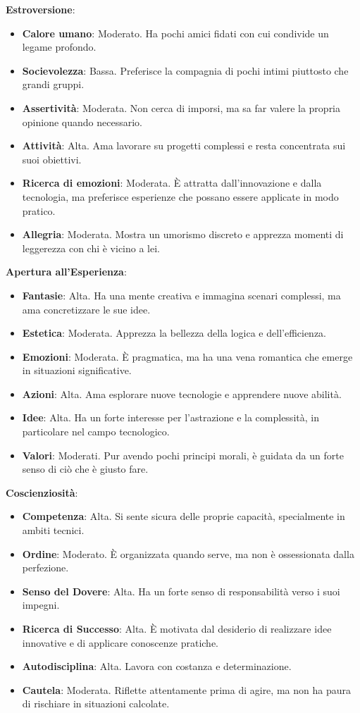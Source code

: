 \textbf{Estroversione}:
\begin{itemize}
    \item \textbf{Calore umano}: Moderato. Ha pochi amici fidati con cui condivide un legame profondo.
    \item \textbf{Socievolezza}: Bassa. Preferisce la compagnia di pochi intimi piuttosto che grandi gruppi.
    \item \textbf{Assertività}: Moderata. Non cerca di imporsi, ma sa far valere la propria opinione quando necessario.
    \item \textbf{Attività}: Alta. Ama lavorare su progetti complessi e resta concentrata sui suoi obiettivi.
    \item \textbf{Ricerca di emozioni}: Moderata. È attratta dall'innovazione e dalla tecnologia, ma preferisce esperienze che possano essere applicate in modo pratico.
    \item \textbf{Allegria}: Moderata. Mostra un umorismo discreto e apprezza momenti di leggerezza con chi è vicino a lei.
\end{itemize}

\textbf{Apertura all'Esperienza}:
\begin{itemize}
    \item \textbf{Fantasie}: Alta. Ha una mente creativa e immagina scenari complessi, ma ama concretizzare le sue idee.
    \item \textbf{Estetica}: Moderata. Apprezza la bellezza della logica e dell'efficienza.
    \item \textbf{Emozioni}: Moderata. È pragmatica, ma ha una vena romantica che emerge in situazioni significative.
    \item \textbf{Azioni}: Alta. Ama esplorare nuove tecnologie e apprendere nuove abilità.
    \item \textbf{Idee}: Alta. Ha un forte interesse per l'astrazione e la complessità, in particolare nel campo tecnologico.
    \item \textbf{Valori}: Moderati. Pur avendo pochi principi morali, è guidata da un forte senso di ciò che è giusto fare.
\end{itemize}

\textbf{Coscienziosità}:
\begin{itemize}
    \item \textbf{Competenza}: Alta. Si sente sicura delle proprie capacità, specialmente in ambiti tecnici.
    \item \textbf{Ordine}: Moderato. È organizzata quando serve, ma non è ossessionata dalla perfezione.
    \item \textbf{Senso del Dovere}: Alta. Ha un forte senso di responsabilità verso i suoi impegni.
    \item \textbf{Ricerca di Successo}: Alta. È motivata dal desiderio di realizzare idee innovative e di applicare conoscenze pratiche.
    \item \textbf{Autodisciplina}: Alta. Lavora con costanza e determinazione.
    \item \textbf{Cautela}: Moderata. Riflette attentamente prima di agire, ma non ha paura di rischiare in situazioni calcolate.
\end{itemize}

